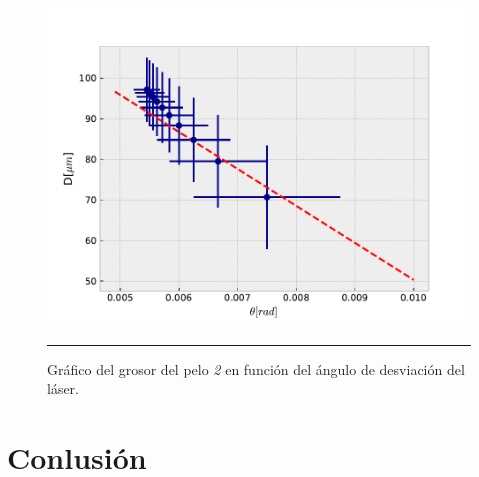 \documentclass[10pt,a4paper]{article}
\begin{document}
\begin{multicols}{2}
	\begin{figure}[H]
		\centering
		\includegraphics[scale=0.4]{Pelo_2.pdf}
		\caption{Gráfico del grosor del pelo \textit{2} en función del ángulo de desviación del láser. }
		\label{Grafico pelo 2}
		\rule{80mm}{0.1mm}
	\end{figure}	
	
	
	

	
	\section{Conlusión}





	
	
	
	\end{multicols}
\end{document}
